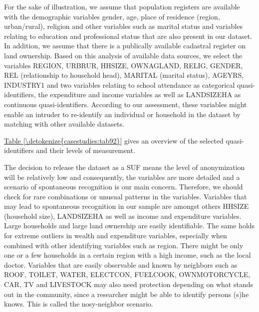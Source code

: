 \documentclass[letterpaper,10pt,english]{sphinxmanual}
\begin{document}
For the sake of illustration, we assume that population registers are
available with the demographic variables gender, age, place of residence
(region, urban/rural), religion and other variables such as marital
status and variables relating to education and professional status that
are also present in our dataset. In addition, we assume that there is a
publically available cadastral register on land ownership. Based on this
analysis of available data sources, we select the variables REGION,
URBRUR, HHSIZE, OWNAGLAND, RELIG, GENDER, REL (relationship to household
head), MARITAL (marital status), AGEYRS, INDUSTRY1 and two variables
relating to school attendance as categorical quasi-identifiers, the
expenditure and income variables as well as LANDSIZEHA as continuous
quasi-identifiers. According to our assessment, these variables might
enable an intruder to re-identify an individual or household in the
dataset by matching with other available datasets.

\hyperref[\detokenize{casestudies:tab92}]{Table \ref{\detokenize{casestudies:tab92}}} gives an overview of the selected quasi-identifiers and their
levels of measurement.

The decision to release the dataset as a SUF means the level of
anonymization will be relatively low and consequently, the variables are
more detailed and a scenario of spontaneous recognition is our main
concern. Therefore, we should check for rare combinations or unusual
patterns in the variables. Variables that may lead to spontaneous
recognition in our sample are amongst others HHSIZE (household size),
LANDSIZEHA as well as income and expenditure variables. Large households
and large land ownership are easily identifiable. The same holds for
extreme outliers in wealth and expenditure variables, especially when
combined with other identifying variables such as region. There might be
only one or a few households in a certain region with a high income,
such as the local doctor. Variables that are easily observable and known
by neighbors such as ROOF, TOILET, WATER, ELECTCON, FUELCOOK,
OWNMOTORCYCLE, CAR, TV and LIVESTOCK may also need protection depending
on what stands out in the community, since a researcher might be able to
identify persons (s)he knows. This is called the nosy-neighbor scenario.
\end{document}
